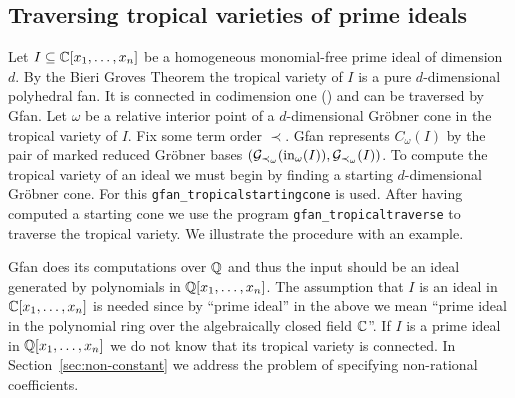 \subsection{Traversing tropical varieties of prime ideals}
Let $I\subseteq \mathbb{C}[x_1,\dots,x_n]$ be a homogeneous monomial-free
prime ideal of dimension $d$. By the Bieri Groves Theorem \cite{bg}
the tropical variety of $I$ is a pure $d$-dimensional polyhedral
fan. It is connected in codimension one (\cite[Theorem~14]{ctv}) and can be
traversed by Gfan. Let $\omega$ be a relative interior point of a
$d$-dimensional Gr\"obner cone in the tropical variety of $I$. Fix
some term order $\prec$. Gfan represents $C_\omega(I)$ by the pair of
marked reduced Gr\"obner bases
$(\mathcal{G}_{\prec_\omega}(\textup{in}_\omega(I)),\mathcal{G}_{\prec_\omega}(I))$.  To
compute the tropical variety of an ideal we must begin by finding a
starting $d$-dimensional Gr\"obner cone. For this
\texttt{gfan\_tropicalstartingcone} is used. %
After having
computed a starting cone we use the program
\texttt{gfan\_tropicaltraverse} to traverse the tropical variety.
We illustrate the procedure with an example.
\begin{remark}
Gfan does its computations over $\mathbb{Q}$ and thus the input should be an
ideal generated by polynomials in $\mathbb{Q}[x_1,\dots,x_n]$. The assumption
that $I$ is an ideal in $\mathbb{C}[x_1,\dots,x_n]$ is needed since by
``prime ideal'' in the above we mean ``prime ideal in the polynomial
ring over the algebraically closed field $\mathbb{C}$''. If $I$ is a prime ideal in
$\mathbb{Q}[x_1,\dots,x_n]$ we do not know that its tropical variety is connected.
 In
Section~\ref{sec:non-constant} we address the problem of specifying non-rational
coefficients.
\end{remark}
